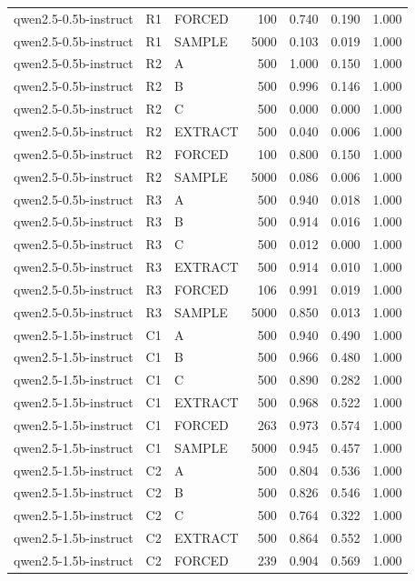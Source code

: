 \begin{table}
\begin{tabular}{lllrrrr}
qwen2.5-0.5b-instruct & R1 & FORCED & 100 & 0.740 & 0.190 & 1.000 \\
qwen2.5-0.5b-instruct & R1 & SAMPLE & 5000 & 0.103 & 0.019 & 1.000 \\
qwen2.5-0.5b-instruct & R2 & A & 500 & 1.000 & 0.150 & 1.000 \\
qwen2.5-0.5b-instruct & R2 & B & 500 & 0.996 & 0.146 & 1.000 \\
qwen2.5-0.5b-instruct & R2 & C & 500 & 0.000 & 0.000 & 1.000 \\
qwen2.5-0.5b-instruct & R2 & EXTRACT & 500 & 0.040 & 0.006 & 1.000 \\
qwen2.5-0.5b-instruct & R2 & FORCED & 100 & 0.800 & 0.150 & 1.000 \\
qwen2.5-0.5b-instruct & R2 & SAMPLE & 5000 & 0.086 & 0.006 & 1.000 \\
qwen2.5-0.5b-instruct & R3 & A & 500 & 0.940 & 0.018 & 1.000 \\
qwen2.5-0.5b-instruct & R3 & B & 500 & 0.914 & 0.016 & 1.000 \\
qwen2.5-0.5b-instruct & R3 & C & 500 & 0.012 & 0.000 & 1.000 \\
qwen2.5-0.5b-instruct & R3 & EXTRACT & 500 & 0.914 & 0.010 & 1.000 \\
qwen2.5-0.5b-instruct & R3 & FORCED & 106 & 0.991 & 0.019 & 1.000 \\
qwen2.5-0.5b-instruct & R3 & SAMPLE & 5000 & 0.850 & 0.013 & 1.000 \\
qwen2.5-1.5b-instruct & C1 & A & 500 & 0.940 & 0.490 & 1.000 \\
qwen2.5-1.5b-instruct & C1 & B & 500 & 0.966 & 0.480 & 1.000 \\
qwen2.5-1.5b-instruct & C1 & C & 500 & 0.890 & 0.282 & 1.000 \\
qwen2.5-1.5b-instruct & C1 & EXTRACT & 500 & 0.968 & 0.522 & 1.000 \\
qwen2.5-1.5b-instruct & C1 & FORCED & 263 & 0.973 & 0.574 & 1.000 \\
qwen2.5-1.5b-instruct & C1 & SAMPLE & 5000 & 0.945 & 0.457 & 1.000 \\
qwen2.5-1.5b-instruct & C2 & A & 500 & 0.804 & 0.536 & 1.000 \\
qwen2.5-1.5b-instruct & C2 & B & 500 & 0.826 & 0.546 & 1.000 \\
qwen2.5-1.5b-instruct & C2 & C & 500 & 0.764 & 0.322 & 1.000 \\
qwen2.5-1.5b-instruct & C2 & EXTRACT & 500 & 0.864 & 0.552 & 1.000 \\
qwen2.5-1.5b-instruct & C2 & FORCED & 239 & 0.904 & 0.569 & 1.000 \\

\end{tabular}
\end{table}
